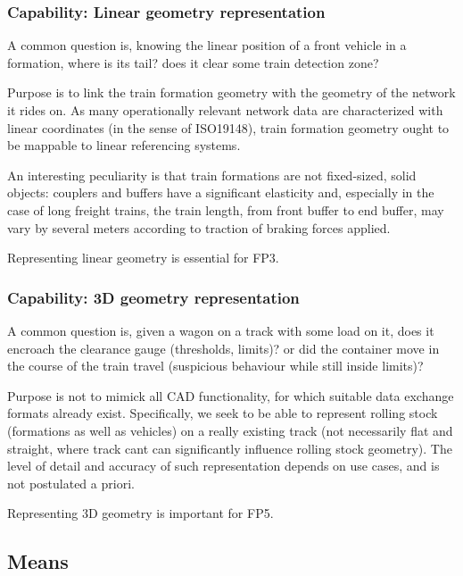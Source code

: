 \documentclass[
  11pt,
]{article}
\begin{document}
\hypertarget{capability-linear-geometry-representation}{%
\subsubsection{Capability: Linear geometry
representation}\label{capability-linear-geometry-representation}}

A common question is, knowing the linear position of a front vehicle in
a formation, where is its tail? does it clear some train detection zone?

Purpose is to link the train formation geometry with the geometry of the
network it rides on. As many operationally relevant network data are
characterized with linear coordinates (in the sense of ISO19148), train
formation geometry ought to be mappable to linear referencing systems.

An interesting peculiarity is that train formations are not fixed-sized,
solid objects: couplers and buffers have a significant elasticity and,
especially in the case of long freight trains, the train length, from
front buffer to end buffer, may vary by several meters according to
traction of braking forces applied.

Representing linear geometry is essential for FP3.

\hypertarget{capability-3d-geometry-representation}{%
\subsubsection{Capability: 3D geometry
representation}\label{capability-3d-geometry-representation}}

A common question is, given a wagon on a track with some load on it,
does it encroach the clearance gauge (thresholds, limits)? or did the
container move in the course of the train travel (suspicious behaviour
while still inside limits)?

Purpose is not to mimick all CAD functionality, for which suitable data
exchange formats already exist. Specifically, we seek to be able to
represent rolling stock (formations as well as vehicles) on a really
existing track (not necessarily flat and straight, where track cant can
significantly influence rolling stock geometry). The level of detail and
accuracy of such representation depends on use cases, and is not
postulated a priori.

Representing 3D geometry is important for FP5.

\hypertarget{means}{%
\subsection{Means}\label{means}}
\end{document}
